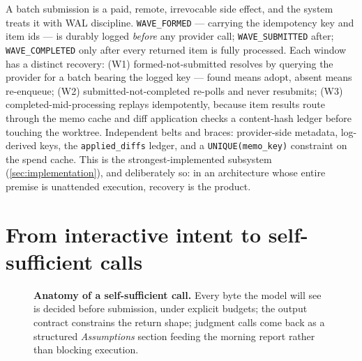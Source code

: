 \documentclass[11pt]{article}
\begin{document}
A batch submission is a paid, remote, irrevocable side effect, and the system treats it with WAL discipline. \texttt{WAVE\_FORMED} --- carrying the idempotency key and item ids --- is durably logged \emph{before} any provider call; \texttt{WAVE\_SUBMITTED} after; \texttt{WAVE\_COMPLETED} only after every returned item is fully processed. Each window has a distinct recovery: (W1) formed-not-submitted resolves by querying the provider for a batch bearing the logged key --- found means adopt, absent means re-enqueue; (W2) submitted-not-completed re-polls and never resubmits; (W3) completed-mid-processing replays idempotently, because item results route through the memo cache and diff application checks a content-hash ledger before touching the worktree. Independent belts and braces: provider-side metadata, log-derived keys, the \texttt{applied\_diffs} ledger, and a \texttt{UNIQUE(memo\_key)} constraint on the spend cache. This is the strongest-implemented subsystem (\cref{sec:implementation}), and deliberately so: in an architecture whose entire premise is unattended execution, recovery is the product.

\section{From interactive intent to self-sufficient calls}
\label{sec:selfsufficiency}

\begin{figure}[!htbp]
\centering

\caption{\textbf{Anatomy of a self-sufficient call.} Every byte the model will see is decided before submission, under explicit budgets; the output contract constrains the return shape; judgment calls come back as a structured \emph{Assumptions} section feeding the morning report rather than blocking execution.}
\label{fig:callanatomy}
\end{figure}
\end{document}
